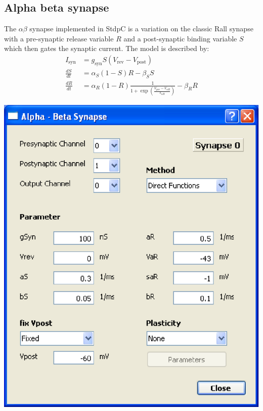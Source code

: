 \documentclass{article}
\begin{document}
\subsection{Alpha beta synapse}
The $\alpha\beta$ synapse implemented in StdpC is a variation on the
classic Rall synapse \cite{Rall1967} with a pre-synaptic release variable $R$ and a
post-synaptic binding variable $S$ which then gates the synaptic
current. The model is described by:
\begin{align}
I_{\text{syn}}&= g_{\text{syn}} S (V_{\text{rev}} -
V_{\text{post}}) \\
 \frac{dS}{dt} &= \alpha_S (1-S)R - \beta_S S  \\
 \frac{dR}{dt} &= \alpha_R (1-R) \frac{1}{1+
   \exp (\frac{V_{\text{pre}}-V_{\alpha R}}{s_{\alpha R}})} -
 \beta_R R  
\end{align}
\parbox[b]{0.48\textwidth}{
\includegraphics[scale=0.5]{abSynDialog}\\}
\hfill
\end{document}
